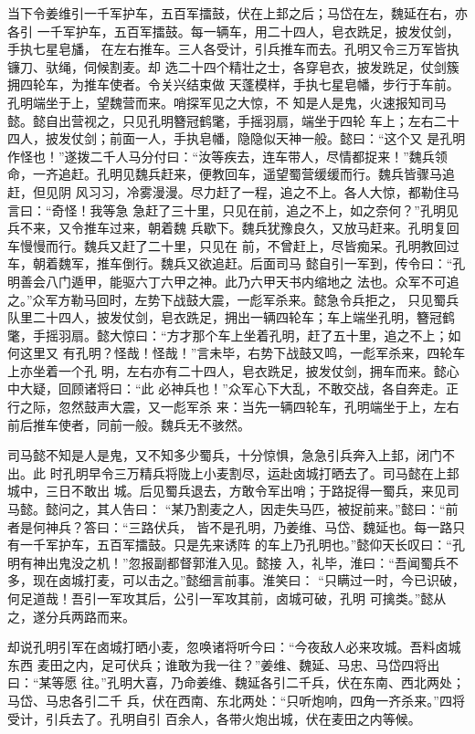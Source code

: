 当下令姜维引一千军护车，五百军擂鼓，伏在上邽之后；马岱在左，魏延在右，亦各引
一千军护车，五百军擂鼓。每一辆车，用二十四人，皂衣跣足，披发仗剑，手执七星皂旙，
在左右推车。三人各受计，引兵推车而去。孔明又令三万军皆执镰刀、驮绳，伺候割麦。却
选二十四个精壮之士，各穿皂衣，披发跣足，仗剑簇拥四轮车，为推车使者。令关兴结束做
天蓬模样，手执七星皂幡，步行于车前。孔明端坐于上，望魏营而来。哨探军见之大惊，不
知是人是鬼，火速报知司马懿。懿自出营视之，只见孔明簪冠鹤氅，手摇羽扇，端坐于四轮
车上；左右二十四人，披发仗剑；前面一人，手执皂幡，隐隐似天神一般。懿曰：“这个又
是孔明作怪也！”遂拨二千人马分付曰：“汝等疾去，连车带人，尽情都捉来！”魏兵领
命，一齐追赶。孔明见魏兵赶来，便教回车，遥望蜀营缓缓而行。魏兵皆骤马追赶，但见阴
风习习，冷雾漫漫。尽力赶了一程，追之不上。各人大惊，都勒住马言曰：“奇怪！我等急
急赶了三十里，只见在前，追之不上，如之奈何？”孔明见兵不来，又令推车过来，朝着魏
兵歇下。魏兵犹豫良久，又放马赶来。孔明复回车慢慢而行。魏兵又赶了二十里，只见在
前，不曾赶上，尽皆痴呆。孔明教回过车，朝着魏军，推车倒行。魏兵又欲追赶。后面司马
懿自引一军到，传令曰：“孔明善会八门遁甲，能驱六丁六甲之神。此乃六甲天书内缩地之
法也。众军不可追之。”众军方勒马回时，左势下战鼓大震，一彪军杀来。懿急令兵拒之，
只见蜀兵队里二十四人，披发仗剑，皂衣跣足，拥出一辆四轮车；车上端坐孔明，簪冠鹤
氅，手摇羽扇。懿大惊曰：“方才那个车上坐着孔明，赶了五十里，追之不上；如何这里又
有孔明？怪哉！怪哉！”言未毕，右势下战鼓又鸣，一彪军杀来，四轮车上亦坐着一个孔
明，左右亦有二十四人，皂衣跣足，披发仗剑，拥车而来。懿心中大疑，回顾诸将曰：“此
必神兵也！”众军心下大乱，不敢交战，各自奔走。正行之际，忽然鼓声大震，又一彪军杀
来：当先一辆四轮车，孔明端坐于上，左右前后推车使者，同前一般。魏兵无不骇然。

司马懿不知是人是鬼，又不知多少蜀兵，十分惊惧，急急引兵奔入上邽，闭门不出。此
时孔明早令三万精兵将陇上小麦割尽，运赴卤城打晒去了。司马懿在上邽城中，三日不敢出
城。后见蜀兵退去，方敢令军出哨；于路捉得一蜀兵，来见司马懿。懿问之，其人告曰：
“某乃割麦之人，因走失马匹，被捉前来。”懿曰：“前者是何神兵？答曰：“三路伏兵，
皆不是孔明，乃姜维、马岱、魏延也。每一路只有一千军护车，五百军擂鼓。只是先来诱阵
的车上乃孔明也。”懿仰天长叹曰：“孔明有神出鬼没之机！”忽报副都督郭淮入见。懿接
入，礼毕，淮曰：“吾闻蜀兵不多，现在卤城打麦，可以击之。”懿细言前事。淮笑曰：
“只瞒过一时，今已识破，何足道哉！吾引一军攻其后，公引一军攻其前，卤城可破，孔明
可擒类。”懿从之，遂分兵两路而来。

却说孔明引军在卤城打晒小麦，忽唤诸将听今曰：“今夜敌人必来攻城。吾料卤城东西
麦田之内，足可伏兵；谁敢为我一往？”姜维、魏延、马忠、马岱四将出曰：“某等愿
往。”孔明大喜，乃命姜维、魏延各引二千兵，伏在东南、西北两处；马岱、马忠各引二千
兵，伏在西南、东北两处：“只听炮响，四角一齐杀来。”四将受计，引兵去了。孔明自引
百余人，各带火炮出城，伏在麦田之内等候。

